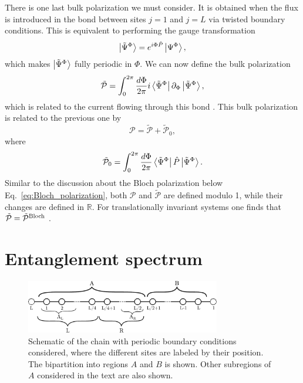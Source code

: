 \documentclass[twocolumn,amsmath,longbibliography,amssymb,superscriptaddress]{revtex4-1}
\begin{document}
There is one last bulk polarization we must consider. 
It is obtained when the flux is introduced in the bond between sites $j=1$ and $j=L$ via twisted boundary conditions. This is equivalent to performing the gauge transformation
\begin{align}\label{eq:Psi_tilde}
\ket{\tilde{\Psi}^\Phi}=e^{i\Phi \hat{P}}\ket{\Psi^\Phi},
\end{align}
which makes $\ket{\tilde{\Psi}^\Phi}$ fully periodic in $\Phi$. We can now define the bulk polarization
\begin{equation}
\tilde{\mathcal{P}} = \int_0^{2\pi}\frac{d\Phi}{2\pi} i\bra{\tilde{\Psi}^\Phi}\partial_\Phi \ket{\tilde{\Psi}^\Phi},
\label{eq:p_tilde}
\end{equation}
which is related to the current flowing through this bond \cite{Watanabe2018}. This bulk polarization is related to the previous one by 
\begin{equation}
\mathcal{P}= \tilde{\mathcal{P}}+\tilde{\mathcal{P}}_0,
\end{equation} 
where
\begin{equation}
\tilde {\mathcal{P}}_0= \int_0^{2\pi}\frac{d\Phi}{2\pi} \bra{\tilde{\Psi}^\Phi}\hat{P}\ket{\tilde{\Psi}^\Phi}.
\end{equation} 
Similar to the discussion about the Bloch polarization below Eq.~\eqref{eq:Bloch_polarization}, both $\mathcal{P}$ and $\tilde{\mathcal{P}}$ are defined modulo 1, while their changes are defined in $\mathbb{R}$. For translationally invariant systems one finds that $\tilde{\mathcal{P}} = \tilde{\mathcal{P}}^{\rm Bloch}$ \cite{Watanabe2018}. 


\section{Entanglement spectrum}
\label{section:ES}

\begin{figure}[t]
	\centering
	\includegraphics[width=85mm]{chain.pdf}
	\caption{Schematic of the chain with periodic boundary conditions considered, where the different sites are labeled by their position. The bipartition into regions $A$ and $B$ is shown. Other subregions of $A$ considered in the text are also shown. }
\label{fig:chain}
\end{figure}
\end{document}
